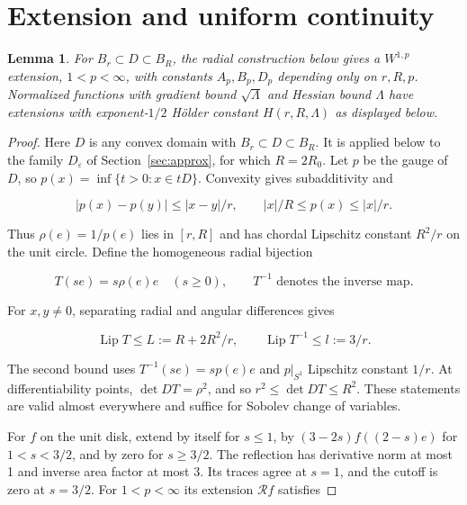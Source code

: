 \documentclass[11pt]{article}
\newtheorem{lemma}[theorem]{Lemma}
\theoremstyle{definition}
\theoremstyle{remark}
\numberwithin{equation}{section}
\begin{document}
\section{Extension and uniform continuity}\label{sec:extension}
\begin{lemma}\label{lem:extension}
For $B_r\subset D\subset B_R$, the radial construction below gives a $W^{1,p}$ extension, $1<p<\infty$, with constants $A_p,B_p,D_p$ depending only on $r,R,p$. Normalized functions with gradient bound $\sqrt\Lambda$ and Hessian bound $\Lambda$ have extensions with exponent-$1/2$ H\"older constant $H(r,R,\Lambda)$ as displayed below.
\end{lemma}
\begin{proof}
Here $D$ is any convex domain with $B_r\subset D\subset B_R$. It is applied below to the family $D_\varepsilon$ of Section~\ref{sec:approx}, for which $R=2R_0$. Let $p$ be the gauge of $D$, so $p(x)=\inf\{t>0:x\in tD\}$. Convexity gives subadditivity and

\begin{equation}\label{eq:src-2-01}
|p(x)-p(y)|\le |x-y|/r,\qquad |x|/R\le p(x)\le|x|/r.
\end{equation}

Thus $\rho(e)=1/p(e)$ lies in $[r,R]$ and has chordal Lipschitz constant $R^2/r$ on the unit circle. Define the homogeneous radial bijection

\begin{equation}\label{eq:src-2-02}
T(se)=s\rho(e)e\quad(s\ge0),\qquad T^{-1}\text{ denotes the inverse map}.
\end{equation}

For $x,y\ne0$, separating radial and angular differences gives

\begin{equation}\label{eq:src-2-03}
\operatorname{Lip}T\le L:=R+2R^2/r,\qquad\operatorname{Lip}T^{-1}\le l:=3/r.
\end{equation}

The second bound uses $T^{-1}(se)=s p(e)e$ and $p|_{S^1}$ Lipschitz constant $1/r$. At differentiability points, $\det DT=\rho^2$, and so $r^2\le\det DT\le R^2$. These statements are valid almost everywhere and suffice for Sobolev change of variables.

For $f$ on the unit disk, extend by itself for $s\le1$, by $(3-2s)f((2-s)e)$ for $1<s<3/2$, and by zero for $s\ge3/2$. The reflection has derivative norm at most 1 and inverse area factor at most 3. Its traces agree at $s=1$, and the cutoff is zero at $s=3/2$. For $1<p<\infty$ its extension $\mathcal R f$ satisfies


\end{proof}
\end{document}
